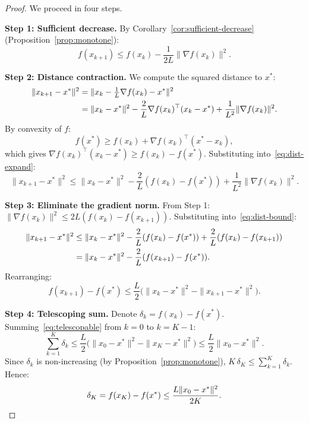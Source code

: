 \documentclass[11pt,a4paper]{article}
\begin{document}
\begin{proof}
We proceed in four steps.

\textbf{Step 1: Sufficient decrease.}
By Corollary~\ref{cor:sufficient-decrease} (Proposition~\ref{prop:monotone}):
\begin{equation}\label{eq:step1}
  f(x_{k+1}) \le f(x_k) - \frac{1}{2L}\|\nabla f(x_k)\|^2.
\end{equation}

\textbf{Step 2: Distance contraction.}
We compute the squared distance to $x^*$:
\begin{align}
  \|x_{k+1} - x^*\|^2
  &= \|x_k - \tfrac{1}{L}\nabla f(x_k) - x^*\|^2 \notag \\
  &= \|x_k - x^*\|^2 - \frac{2}{L}\nabla f(x_k)^\top(x_k - x^*)
     + \frac{1}{L^2}\|\nabla f(x_k)\|^2. \label{eq:dist-expand}
\end{align}
By convexity of $f$:
\begin{equation}\label{eq:convexity-lower}
  f(x^*) \ge f(x_k) + \nabla f(x_k)^\top(x^* - x_k),
\end{equation}
which gives $\nabla f(x_k)^\top(x_k - x^*) \ge f(x_k) - f(x^*)$.
Substituting into~\eqref{eq:dist-expand}:
\begin{equation}\label{eq:dist-bound}
  \|x_{k+1} - x^*\|^2 \le \|x_k - x^*\|^2
    - \frac{2}{L}(f(x_k) - f(x^*)) + \frac{1}{L^2}\|\nabla f(x_k)\|^2.
\end{equation}

\textbf{Step 3: Eliminate the gradient norm.}
From Step 1: $\|\nabla f(x_k)\|^2 \le 2L(f(x_k) - f(x_{k+1}))$.
Substituting into~\eqref{eq:dist-bound}:
\begin{align}
  \|x_{k+1} - x^*\|^2
  &\le \|x_k - x^*\|^2 - \frac{2}{L}(f(x_k) - f(x^*))
    + \frac{2}{L}(f(x_k) - f(x_{k+1})) \notag \\
  &= \|x_k - x^*\|^2 - \frac{2}{L}(f(x_{k+1}) - f(x^*)). \label{eq:dist-clean}
\end{align}
Rearranging:
\begin{equation}\label{eq:telescopable}
  f(x_{k+1}) - f(x^*) \le \frac{L}{2}\bigl(\|x_k - x^*\|^2
  - \|x_{k+1} - x^*\|^2\bigr).
\end{equation}

\textbf{Step 4: Telescoping sum.}
Denote $\delta_k = f(x_k) - f(x^*)$. Summing~\eqref{eq:telescopable} from
$k = 0$ to $k = K - 1$:
\begin{equation}\label{eq:telescope}
  \sum_{k=1}^{K} \delta_k \le \frac{L}{2}\bigl(\|x_0 - x^*\|^2
  - \|x_K - x^*\|^2\bigr) \le \frac{L}{2}\|x_0 - x^*\|^2.
\end{equation}
Since $\delta_k$ is non-increasing (by Proposition~\ref{prop:monotone}),
$K\, \delta_K \le \sum_{k=1}^K \delta_k$. Hence:
\begin{equation}\label{eq:final-rate}
  \delta_K = f(x_K) - f(x^*) \le \frac{L\|x_0 - x^*\|^2}{2K}. \qedhere
\end{equation}
\end{proof}
\end{document}
